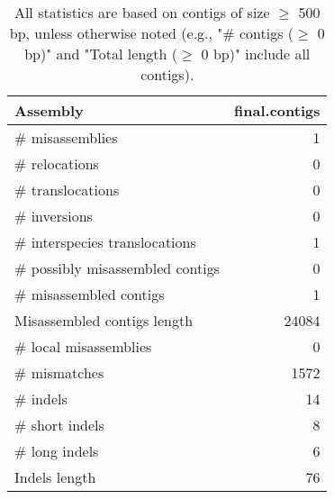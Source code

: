 \documentclass[12pt,a4paper]{article}
\begin{document}
\begin{table}[ht]
\begin{center}
\caption{All statistics are based on contigs of size $\geq$ 500 bp, unless otherwise noted (e.g., "\# contigs ($\geq$ 0 bp)" and "Total length ($\geq$ 0 bp)" include all contigs).}
\begin{tabular}{|l*{1}{|r}|}
\hline
Assembly & final.contigs \\ \hline
\# misassemblies & 1 \\ \hline
\hspace{5mm}\# relocations & 0 \\ \hline
\hspace{5mm}\# translocations & 0 \\ \hline
\hspace{5mm}\# inversions & 0 \\ \hline
\hspace{5mm}\# interspecies translocations & 1 \\ \hline
\# possibly misassembled contigs & 0 \\ \hline
\# misassembled contigs & 1 \\ \hline
Misassembled contigs length & 24084 \\ \hline
\# local misassemblies & 0 \\ \hline
\# mismatches & 1572 \\ \hline
\# indels & 14 \\ \hline
\hspace{5mm}\# short indels & 8 \\ \hline
\hspace{5mm}\# long indels & 6 \\ \hline
Indels length & 76 \\ \hline
\end{tabular}
\end{center}
\end{table}
\end{document}
